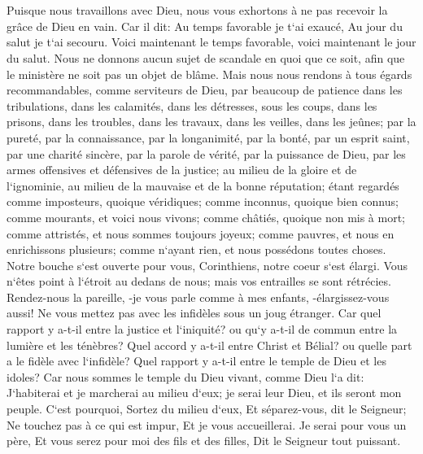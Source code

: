 \chapter{}

\verse Puisque nous travaillons avec Dieu, nous vous exhortons à ne pas recevoir la grâce de Dieu en vain. 
\verse Car il dit: Au temps favorable je t`ai exaucé, Au jour du salut je t`ai secouru. Voici maintenant le temps favorable, voici maintenant le jour du salut. 
\verse Nous ne donnons aucun sujet de scandale en quoi que ce soit, afin que le ministère ne soit pas un objet de blâme. 
\verse Mais nous nous rendons à tous égards recommandables, comme serviteurs de Dieu, par beaucoup de patience dans les tribulations, dans les calamités, dans les détresses, 
\verse sous les coups, dans les prisons, dans les troubles, dans les travaux, dans les veilles, dans les jeûnes; 
\verse par la pureté, par la connaissance, par la longanimité, par la bonté, par un esprit saint, par une charité sincère, 
\verse par la parole de vérité, par la puissance de Dieu, par les armes offensives et défensives de la justice; 
\verse au milieu de la gloire et de l`ignominie, au milieu de la mauvaise et de la bonne réputation; étant regardés comme imposteurs, quoique véridiques; 
\verse comme inconnus, quoique bien connus; comme mourants, et voici nous vivons; comme châtiés, quoique non mis à mort; 
\verse comme attristés, et nous sommes toujours joyeux; comme pauvres, et nous en enrichissons plusieurs; comme n`ayant rien, et nous possédons toutes choses. 
\verse Notre bouche s`est ouverte pour vous, Corinthiens, notre coeur s`est élargi. 
\verse Vous n`êtes point à l`étroit au dedans de nous; mais vos entrailles se sont rétrécies. 
\verse Rendez-nous la pareille, -je vous parle comme à mes enfants, -élargissez-vous aussi! 
\verse Ne vous mettez pas avec les infidèles sous un joug étranger. Car quel rapport y a-t-il entre la justice et l`iniquité? ou qu`y a-t-il de commun entre la lumière et les ténèbres? 
\verse Quel accord y a-t-il entre Christ et Bélial? ou quelle part a le fidèle avec l`infidèle? 
\verse Quel rapport y a-t-il entre le temple de Dieu et les idoles? Car nous sommes le temple du Dieu vivant, comme Dieu l`a dit: J`habiterai et je marcherai au milieu d`eux; je serai leur Dieu, et ils seront mon peuple. 
\verse C`est pourquoi, Sortez du milieu d`eux, Et séparez-vous, dit le Seigneur; Ne touchez pas à ce qui est impur, Et je vous accueillerai. 
\verse Je serai pour vous un père, Et vous serez pour moi des fils et des filles, Dit le Seigneur tout puissant. 


